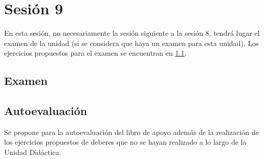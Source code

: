 





\section{Sesión 9}


En esta sesión, no necesariamente la sesión siguiente a la sesión 8, tendrá lugar el examen de la unidad (si se considera que haya un examen para esta unidad).
%
Los ejercicios propuestos para el examen se encuentran en \ref{examen}.


\subsection{Examen}
\label{examen}




\subsection{Autoevaluación}
\label{app:autoeval}

Se propone para la autoevaluación del libro de apoyo \cite[p. 120]{MareaVerde} además de la realización de los ejercicios propuestos de deberes que no se hayan realizado a lo largo de la Unidad Didáctica.




